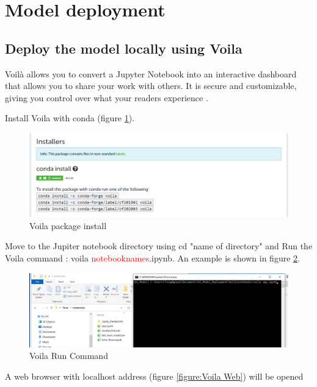\section{Model deployment}
\subsection{Deploy the model locally using Voila}

Voilà allows you to convert a Jupyter Notebook into an interactive dashboard that allows you to share your work with others. It is secure and customizable, giving you control over what your readers experience \cite{Voila}.

Install Voila with conda (figure \ref{figure:Voila}).

\begin{figure}[H]
	\centering
	\includegraphics[width=0.8\columnwidth]{Pictures/Voila.png}
	\caption[Short title]{Voila package install}
	\label{figure:Voila}
\end{figure}

Move to the Jupiter notebook directory using cd "name of directory" and Run the Voila command : voila \textcolor{	red}{notebooknames}.ipynb. An example is shown in figure \ref{figure:Voila Run}.

\begin{figure}[H]
	\centering
	\includegraphics[width=0.8\columnwidth]{Pictures/Voila Run command.png}
	\caption[Short title]{Voila Run Command}
	\label{figure:Voila Run}
\end{figure}

A web browser with localhost address (figure \ref{figure:Voila Web}) will be 
opened 

